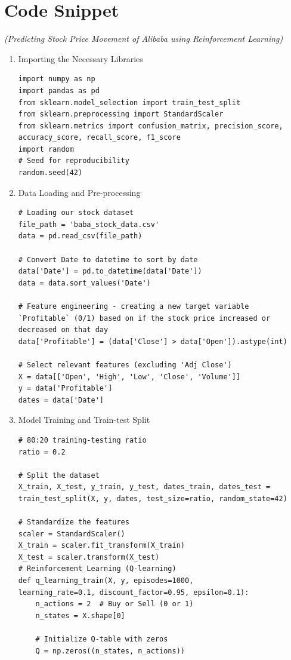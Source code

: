 \documentclass[12pt,a4paper]{report}
\begin{document}
\section{Code Snippet} \textit{(Predicting Stock Price Movement of Alibaba using Reinforcement Learning)}


\begin{enumerate}
        \item Importing the Necessary Libraries
        \begin{verbatim}
import numpy as np
import pandas as pd
from sklearn.model_selection import train_test_split
from sklearn.preprocessing import StandardScaler
from sklearn.metrics import confusion_matrix, precision_score, 
accuracy_score, recall_score, f1_score
import random
# Seed for reproducibility
random.seed(42)
       \end{verbatim}
       \item Data Loading and Pre-processing 
       \begin{verbatim}
# Loading our stock dataset
file_path = 'baba_stock_data.csv'
data = pd.read_csv(file_path)

# Convert Date to datetime to sort by date
data['Date'] = pd.to_datetime(data['Date'])
data = data.sort_values('Date')

# Feature engineering - creating a new target variable 
`Profitable` (0/1) based on if the stock price increased or 
decreased on that day
data['Profitable'] = (data['Close'] > data['Open']).astype(int)

# Select relevant features (excluding 'Adj Close')
X = data[['Open', 'High', 'Low', 'Close', 'Volume']]
y = data['Profitable']
dates = data['Date']
       \end{verbatim}
     \item Model Training and Train-test Split 
     \begin{verbatim}
# 80:20 training-testing ratio
ratio = 0.2

# Split the dataset
X_train, X_test, y_train, y_test, dates_train, dates_test = 
train_test_split(X, y, dates, test_size=ratio, random_state=42)

# Standardize the features
scaler = StandardScaler()
X_train = scaler.fit_transform(X_train)
X_test = scaler.transform(X_test)
# Reinforcement Learning (Q-learning)
def q_learning_train(X, y, episodes=1000,
learning_rate=0.1, discount_factor=0.95, epsilon=0.1):
    n_actions = 2  # Buy or Sell (0 or 1)
    n_states = X.shape[0]
    
    # Initialize Q-table with zeros
    Q = np.zeros((n_states, n_actions))
    

\end{verbatim}
\end{enumerate}
\end{document}
